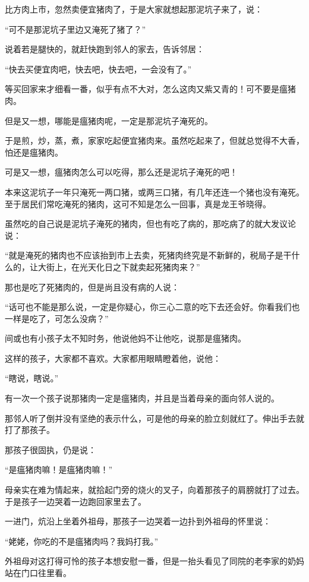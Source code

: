 \par 比方肉上市，忽然卖便宜猪肉了，于是大家就想起那泥坑子来了，说：
\par “可不是那泥坑子里边又淹死了猪了？”
\par 说着若是腿快的，就赶快跑到邻人的家去，告诉邻居：
\par “快去买便宜肉吧，快去吧，快去吧，一会没有了。”
\par 等买回家来才细看一番，似乎有点不大对，怎么这肉又紫又青的！可不要是瘟猪肉。
\par 但是又一想，哪能是瘟猪肉呢，一定是那泥坑子淹死的。
\par 于是煎，炒，蒸，煮，家家吃起便宜猪肉来。虽然吃起来了，但就总觉得不大香，怕还是瘟猪肉。
\par 可是又一想，瘟猪肉怎么可以吃得，那么还是泥坑子淹死的吧！
\par 本来这泥坑子一年只淹死一两口猪，或两三口猪，有几年还连一个猪也没有淹死。至于居民们常吃淹死的猪肉，这可不知是怎么一回事，真是龙王爷晓得。
\par 虽然吃的自己说是泥坑子淹死的猪肉，但也有吃了病的，那吃病了的就大发议论说：
\par “就是淹死的猪肉也不应该抬到市上去卖，死猪肉终究是不新鲜的，税局子是干什么的，让大街上，在光天化日之下就卖起死猪肉来？”
\par 那也是吃了死猪肉的，但是尚且没有病的人说：
\par “话可也不能是那么说，一定是你疑心，你三心二意的吃下去还会好。你看我们也一样是吃了，可怎么没病？”
\par 间或也有小孩子太不知时务，他说他妈不让他吃，说那是瘟猪肉。
\par 这样的孩子，大家都不喜欢。大家都用眼睛瞪着他，说他：
\par “瞎说，瞎说。”
\par 有一次一个孩子说那猪肉一定是瘟猪肉，并且是当着母亲的面向邻人说的。
\par 那邻人听了倒并没有坚绝的表示什么，可是他的母亲的脸立刻就红了。伸出手去就打了那孩子。
\par 那孩子很固执，仍是说：
\par “是瘟猪肉嘛！是瘟猪肉嘛！”
\par 母亲实在难为情起来，就拾起门旁的烧火的叉子，向着那孩子的肩膀就打了过去。于是孩子一边哭着一边跑回家里去了。
\par 一进门，炕沿上坐着外祖母，那孩子一边哭着一边扑到外祖母的怀里说：
\par “姥姥，你吃的不是瘟猪肉吗？我妈打我。”
\par 外祖母对这打得可怜的孩子本想安慰一番，但是一抬头看见了同院的老李家的奶妈站在门口往里看。
